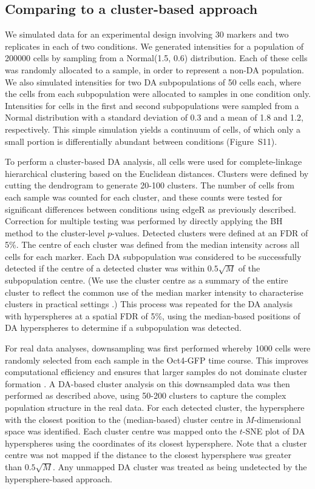 \documentclass{article}
\newcommand{\suppfigclustersim}{S11}
\begin{document}
\subsection{Comparing to a cluster-based approach}
We simulated data for an experimental design involving 30 markers and two replicates in each of two conditions.
We generated intensities for a population of 200000 cells by sampling from a Normal(1.5, 0.6) distribution.
Each of these cells was randomly allocated to a sample, in order to represent a non-DA population.
We also simulated intensities for two DA subpopulations of 50 cells each, where the cells from each subpopulation were allocated to samples in one condition only.
Intensities for cells in the first and second subpopulations were sampled from a Normal distribution with a standard deviation of 0.3 and a mean of 1.8 and 1.2, respectively.
This simple simulation yields a continuum of cells, of which only a small portion is differentially abundant between conditions (Figure~\suppfigclustersim{}).

To perform a cluster-based DA analysis, all cells were used for complete-linkage hierarchical clustering based on the Euclidean distances.
Clusters were defined by cutting the dendrogram to generate 20-100 clusters.
The number of cells from each sample was counted for each cluster, and these counts were tested for significant differences between conditions using edgeR as previously described.
Correction for multiple testing was performed by directly applying the BH method to the cluster-level $p$-values.
Detected clusters were defined at an FDR of 5\%.
The centre of each cluster was defined from the median intensity across all cells for each marker.
Each DA subpopulation was considered to be successfully detected if the centre of a detected cluster was within $0.5\sqrt{M}$ of the subpopulation centre.
(We use the cluster centre as a summary of the entire cluster to reflect the common use of the median marker intensity to characterise clusters in practical settings \cite{qiu2011extracting,bruggner2014automated}.)
This process was repeated for the DA analysis with hyperspheres at a spatial FDR of 5\%, using the median-based positions of DA hyperspheres to determine if a subpopulation was detected.

For real data analyses, downsampling was first performed whereby 1000 cells were randomly selected from each sample in the Oct4-GFP time course.
This improves computational efficiency and ensures that larger samples do not dominate cluster formation \cite{bruggner2014automated}.
A DA-based cluster analysis on this downsampled data was then performed as described above, using 50-200 clusters to capture the complex population structure in the real data.
For each detected cluster, the hypersphere with the closest position to the (median-based) cluster centre in $M$-dimensional space was identified.
Each cluster centre was mapped onto the $t$-SNE plot of DA hyperspheres using the coordinates of its closest hypersphere.
Note that a cluster centre was not mapped if the distance to the closest hypersphere was greater than $0.5\sqrt{M}$.
Any unmapped DA cluster was treated as being undetected by the hypersphere-based approach.
\end{document}
